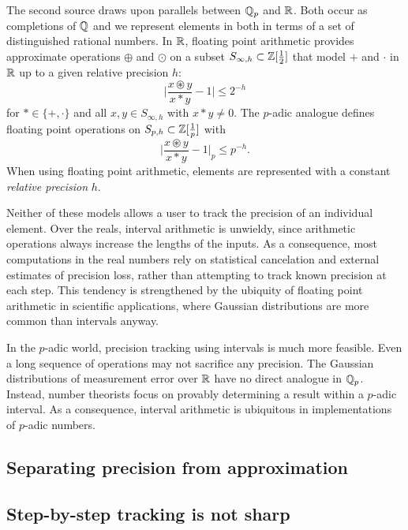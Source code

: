 \documentclass{lms}
\begin{document}
The second source draws upon parallels between $\mathbb Q_p$ and $\mathbb R$.  Both
occur as completions of $\mathbb Q$ and we represent elements in both in terms
of a set of distinguished rational numbers.
In $\mathbb R$, floating point arithmetic provides approximate operations $\oplus$ and $\odot$ on a
subset $S_{\infty,h} \subset \mathbb Z[\frac12]$ that model $+$ and $\cdot$ in $\mathbb R$ up to a given relative precision $h$:
\[
\lvert \frac{x \circledast y}{x \ast y} - 1 \rvert \le 2^{-h}
\]
for $\ast \in \{+, \cdot\}$ and all $x, y \in S_{\infty,h}$ with $x \ast y \ne 0$.  The $p$-adic analogue
defines floating point operations on $S_{p,h} \subset \mathbb Z[\frac1p]$ with
\[
\lvert \frac{x \circledast y}{x \ast y} - 1 \rvert_p \le p^{-h}.
\]
When using floating point arithmetic, elements are represented with a constant \emph{relative precision} $h$.

Neither of these models allows a user to track the precision of an individual element.
Over the reals, interval arithmetic is unwieldy, since arithmetic operations always increase the lengths of the inputs.
As a consequence, most computations in the real numbers rely on
statistical cancelation and external estimates of precision loss, rather than
attempting to track known precision at each step.  This tendency is strengthened
by the ubiquity of floating point arithmetic in scientific applications, where Gaussian
distributions are more common than intervals anyway.

In the $p$-adic world, precision tracking using intervals is much more feasible.
Even a long sequence of operations may not sacrifice any precision.
The Gaussian distributions of measurement error over $\mathbb R$ have no direct analogue in
$\mathbb Q_p$.  Instead, number theorists focus on provably determining
a result within a $p$-adic interval.  As a consequence, interval arithmetic is ubiquitous
in implementations of $p$-adic numbers.  %



\subsection{Separating precision from approximation}




\subsection{Step-by-step tracking is not sharp}
\label{ssec:stepbystep}
\end{document}
